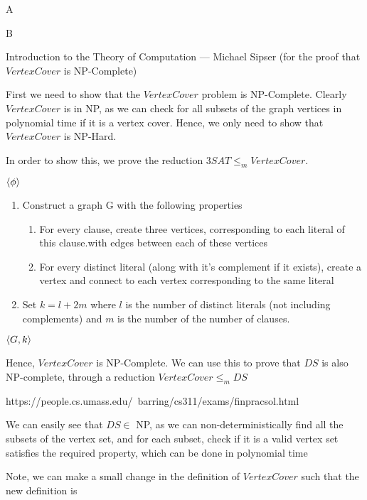 \documentclass{article}
\begin{document}
\begin{question}
\begin{qpart}{A}
	\end{qpart}

	\begin{qpart}{B}

		 Introduction to the Theory of Computation --- Michael Sipser (for the proof that $VertexCover$ is NP-Complete) \br%

		First we need to show that the $VertexCover$ problem is NP-Complete. Clearly $VertexCover$ is in NP, as we can check for all subsets of the graph vertices in polynomial time if it is a vertex cover. Hence, we only need to show that $VertexCover$ is NP-Hard. \br%

		In order to show this, we prove the reduction $3SAT \le _m VertexCover$. \br%

		 \br%

		 $\left\langle \phi \right\rangle$
		\begin{enumerate}[label = (\alph*) ]
			\item Construct a graph G with the following properties
				\begin{enumerate}[label = (\roman*) ]
					\item For every clause, create three vertices, corresponding to each literal of this clause.with edges between each of these vertices
					\item For every distinct literal (along with it's complement if it exists), create a vertex and connect to each vertex corresponding to the same literal
				\end{enumerate}
			\item Set $k = l + 2m$ where $l$ is the number of distinct literals (not including complements) and $m$ is the number of the number of clauses.
		\end{enumerate}
		 $\left\langle G, k \right\rangle$ \br%

		Hence, $VertexCover$ is NP-Complete. We can use this to prove that $DS$ is also NP-complete, through a reduction $VertexCover \le _m DS$ \br%

		 https://people.cs.umass.edu/~barring/cs311/exams/finpracsol.html

		We can easily see that $DS \in$ NP, as we can non-deterministically find all the subsets of the vertex set, and for each subset, check if it is a valid vertex set  satisfies the required property, which can be done in polynomial time \br%

		Note, we can make a small change in the definition of $VertexCover$ such that the new definition is


\end{qpart}
\end{question}
\end{document}
